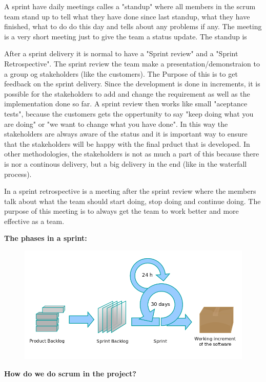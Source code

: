 A sprint have daily meetings calles a "standup" where all members in the scrum team stand up
to tell what they have done since last standup, what they have finished, what to do do this day and
tells about any problems if any. The meeting is a very short meeting just to give the team a status
update. The standup is 

After a sprint delivery it is normal to have a "Sprint review" and a "Sprint Retrospective".
The sprint review the team make a presentation/demonstraion to a group og stakeholders (like the
customers). The Purpose of this is to get feedback on the sprint delivery. Since the development
is done in increments, it is possible for the stakeholders to add and change the requirement as
well as the implementation done so far. A sprint review then works like small "aceptance tests", 
because the customers gets the oppertunity to say "keep doing what you are doing" or "we want to change
what you have done". In this way the stakeholders are always aware of the status and it is important
way to ensure that the stakeholders will be happy with the final prduct that is developed. 
In other methodologies, the stakeholders is not as much a part of this because there is nor a 
continous delivery, but a big delivery in the end (like in the waterfall process).

In a sprint retrospective is a meeting after the sprint review where the members talk about what 
the team should start doing, stop doing and continue doing. The purpose of this meeting is to always 
get the team to work better and more effective as a team.

{\bf The phases in a sprint: }

\begin{figure}[!ht]
    \includegraphics[scale=0.4]{pictures/Scrumprocess.png}
\end{figure}

{\bf How do we do scrum in the project? }


